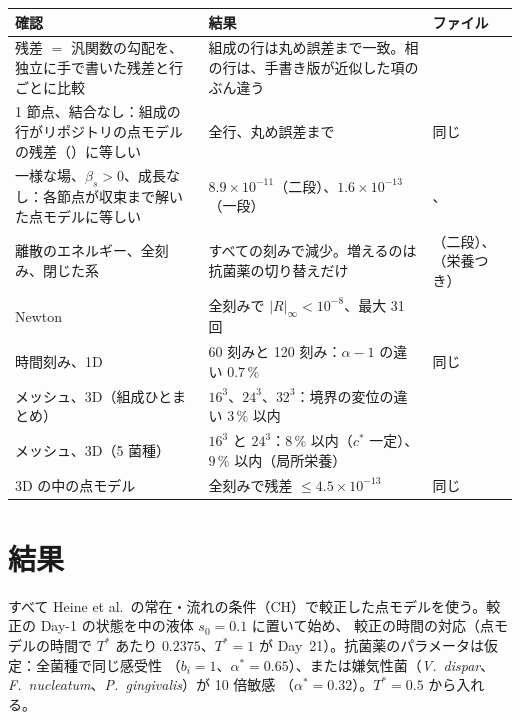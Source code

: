 \documentclass[11pt,a4paper]{article}
\theoremstyle{definition}
\begin{document}
\begin{center}\small
\begin{tabularx}{\linewidth}{@{}Yp{3.4cm}p{4.3cm}@{}}
\toprule
確認 & 結果 & ファイル\\
\midrule
残差 $=$ 汎関数の勾配を、独立に手で書いた残差と行ごとに比較 & 組成の行は丸め誤差まで一致。相の行は、手書き版が近似した項のぶん違う
& \\
1 節点、結合なし：組成の行がリポジトリの点モデルの残差（）に等しい & 全行、丸め誤差まで & 同じ\\
一様な場、$\beta_s>0$、成長なし：各節点が収束まで解いた点モデルに等しい & $8.9\times10^{-11}$（二段）、$1.6\times10^{-13}$（一段）
& 、\\
離散のエネルギー、全刻み、閉じた系 & すべての刻みで減少。増えるのは抗菌薬の切り替えだけ & （二段）、
（栄養つき）\\
Newton & 全刻みで $|R|_\infty<10^{-8}$、最大 31 回 & \\
時間刻み、1D & 60 刻みと 120 刻み：$\alpha-1$ の違い $0.7\,\%$ & 同じ\\
メッシュ、3D（組成ひとまとめ） & $16^3$、$24^3$、$32^3$：境界の変位の違い $3\,\%$ 以内 & \\
メッシュ、3D（5 菌種） & $16^3$ と $24^3$：$8\,\%$ 以内（$c^*$ 一定）、$9\,\%$ 以内（局所栄養） & \\
3D の中の点モデル & 全刻みで残差 $\le4.5\times10^{-13}$ & 同じ\\
\bottomrule
\end{tabularx}
\end{center}

\section{結果}
\label{sec:results}

すべて Heine et al.\ の常在・流れの条件（CH）で較正した点モデルを使う。較正の Day-1 の状態を中の液体 $s_0=0.1$ に置いて始め、
較正の時間の対応（点モデルの時間で $T^*$ あたり $0.2375$、$T^*=1$ が Day~21）。抗菌薬のパラメータは仮定：全菌種で同じ感受性
（$b_i=1$、$\alpha^*=0.65$）、または嫌気性菌（\textit{V.~dispar}、\textit{F.~nucleatum}、\textit{P.~gingivalis}）が 10 倍敏感
（$\alpha^*=0.32$）。$T^*=0.5$ から入れる。
\end{document}
